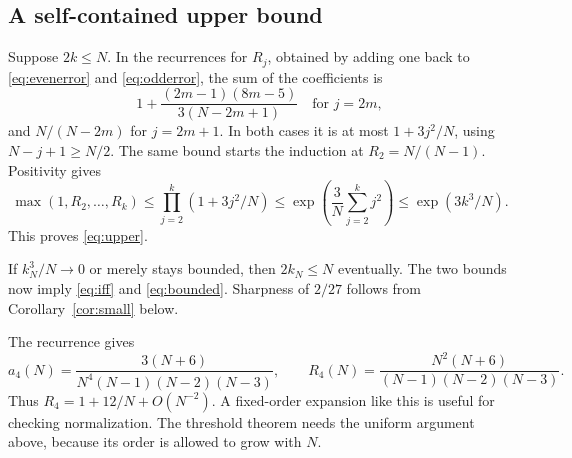 \subsection{A self-contained upper bound}

Suppose $2k\le N$. In the recurrences for $R_j$, obtained by adding one back to \eqref{eq:evenerror} and \eqref{eq:odderror}, the sum of the coefficients is
\[
1+\frac{(2m-1)(8m-5)}{3(N-2m+1)}
\quad\text{for }j=2m,
\]
and $N/(N-2m)$ for $j=2m+1$. In both cases it is at most $1+3j^2/N$, using $N-j+1\ge N/2$. The same bound starts the induction at $R_2=N/(N-1)$. Positivity gives
\[
\max(1,R_2,\ldots,R_k)
\le\prod_{j=2}^k(1+3j^2/N)
\le\exp\left(\frac3N\sum_{j=2}^k j^2\right)
\le\exp(3k^3/N).
\]
This proves \eqref{eq:upper}.

If $k_N^3/N\to0$ or merely stays bounded, then $2k_N\le N$ eventually. The two bounds now imply \eqref{eq:iff} and \eqref{eq:bounded}. Sharpness of $2/27$ follows from Corollary~\ref{cor:small} below.

\begin{example}
The recurrence gives
\[
a_4(N)=\frac{3(N+6)}{N^4(N-1)(N-2)(N-3)},\qquad
R_4(N)=\frac{N^2(N+6)}{(N-1)(N-2)(N-3)}.
\]
Thus $R_4=1+12/N+O(N^{-2})$. A fixed-order expansion like this is useful for checking normalization. The threshold theorem needs the uniform argument above, because its order is allowed to grow with $N$.
\end{example}

